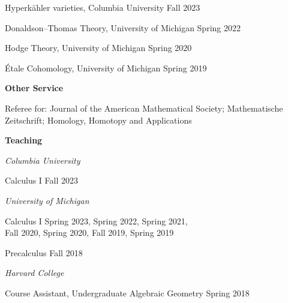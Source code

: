 \documentclass[11 pt]{letter}
\begin{document}
	Hyperk\"ahler varieties, Columbia University \hfill Fall 2023

	Donaldson--Thomas Theory, University of Michigan \hfill Spring 2022

	Hodge Theory, University of Michigan \hfill Spring 2020

	\'Etale Cohomology, University of Michigan \hfill Spring 2019 

	

	\medskip
	\noindent
	\textbf{Other Service}

	Referee for: Journal of the American Mathematical Society; Mathematische Zeitschrift; Homology, Homotopy and Applications


	\medskip
	\noindent
	\textbf{\large{Teaching}}

	\noindent \emph{Columbia University}

	Calculus I \hfill Fall 2023


	\noindent \emph{University of Michigan}


	

	Calculus I \hfill Spring 2023, Spring 2022, Spring 2021, \\ 
	\null \hfill Fall 2020, Spring 2020, Fall 2019, Spring 2019



	Precalculus \hfill Fall 2018 


	\noindent \emph{Harvard College}

	Course Assistant, Undergraduate Algebraic Geometry \hfill Spring 2018



	









	

\end{document}
